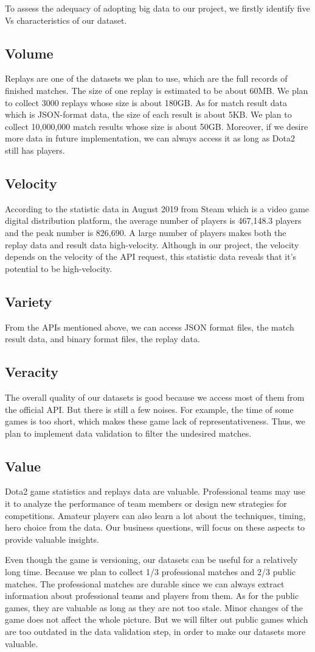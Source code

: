 \documentclass{article}
\newcommand{\bigdataVs}[1]{
	\subsection{#1}
}
\begin{document}
To assess the adequacy of adopting big data to our project, we firstly identify five Vs characteristics of our dataset.

\bigdataVs{Volume}

Replays are one of the datasets we plan to use, which are the full records of finished matches. The size of one replay is estimated to be about 60MB. We plan to collect 3000 replays whose size is about 180GB. As for match result data which is JSON-format data, the size of each result is about 5KB. We plan to collect 10,000,000 match results whose size is about 50GB. Moreover, if we desire more data in future implementation, we can always access it as long as Dota2 still has players.

\bigdataVs{Velocity}

According to the statistic data in August 2019 from Steam which is a video game digital distribution platform, the average number of players is 467,148.3 players and the peak number is 826,690.
A large number of players makes both the replay data and result data high-velocity.
Although in our project, the velocity depends on the velocity of the API request, this statistic data reveals that it's potential to be high-velocity.

\bigdataVs{Variety}

From the APIs mentioned above, we can access JSON format files, the match result data, and binary format files, the replay data.

\bigdataVs{Veracity}

The overall quality of our datasets is good because we access most of them from the official API.
But there is still a few noises.
For example, the time of some games is too short, which makes these game lack of representativeness.
Thus, we plan to implement data validation to filter the undesired matches.

\bigdataVs{Value}

Dota2 game statistics and replays data are valuable.
Professional teams may use it to analyze the performance of team members or design new strategies for competitions.
Amateur players can also learn a lot about the techniques, timing, hero choice from the data.
Our business questions, will focus on these aspects to provide valuable insights.

Even though the game is versioning, our datasets can be useful for a relatively long time.
Because we plan to collect 1/3 professional matches and 2/3 public matches.
The professional matches are durable since we can always extract information about professional teams and players from them.
As for the public games, they are valuable as long as they are not too stale. Minor changes of the game does not affect the whole picture.
But we will filter out public games which are too outdated in the data validation step, in order to make our datasets more valuable.
\end{document}
